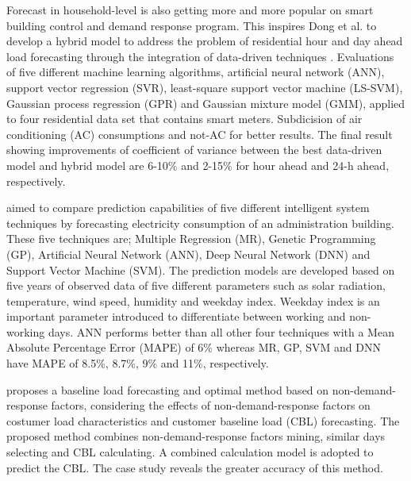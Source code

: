 Forecast in household-level is also getting more and more popular on smart building control and demand response program.
This inspires Dong et al. to develop a hybrid model to address the problem of residential hour and day ahead load forecasting through the integration of data-driven techniques \cite{DONG2016341}.
Evaluations of five different machine learning algorithms, artificial neural network (ANN), support vector regression (SVR), least-square support vector machine (LS-SVM), Gaussian process regression (GPR) and Gaussian mixture model (GMM), applied to four residential data set that contains smart meters.
Subdicision of air conditioning (AC) consumptions and not-AC for better results.
The final result showing improvements of coefficient of variance between the best data-driven model and hybrid model are 6-10\% and 2-15\% for hour ahead and 24-h ahead, respectively.

\cite{AMBER2018886} aimed to compare prediction capabilities of five different intelligent system techniques by forecasting electricity consumption of an administration building.
These five techniques are; Multiple Regression (MR), Genetic Programming (GP), Artificial Neural Network (ANN), Deep Neural Network (DNN) and Support Vector Machine (SVM). 
The prediction models are developed based on five years of observed data of five different parameters such as solar radiation, temperature, wind speed, humidity and weekday index.
Weekday index is an important parameter introduced to differentiate between working and non-working days.
ANN performs better than all other four techniques with a Mean Absolute Percentage Error (MAPE) of 6\% whereas MR, GP, SVM and DNN have MAPE of 8.5\%, 8.7\%, 9\% and 11\%, respectively.

\cite{7576207} proposes a baseline load forecasting and optimal method based on non-demand-response factors, considering the effects of non-demand-response factors on costumer load characteristics and customer baseline load (CBL) forecasting.
The proposed method combines non-demand-response factors mining, similar days selecting and CBL calculating.
A combined calculation model is adopted to predict the CBL.
The case study reveals the greater accuracy of this method.

